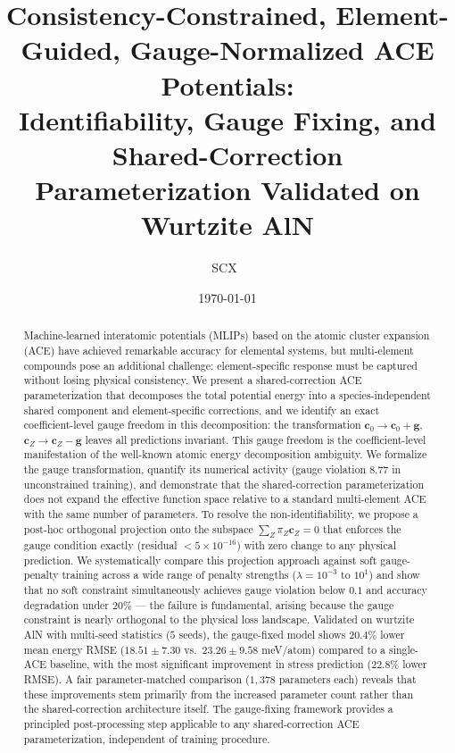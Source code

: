 \documentclass[twoside,prb,aps,floatfix,superscriptaddress,longbibliography]{revtex4-2}
\begin{document}
\title{Consistency-Constrained, Element-Guided, Gauge-Normalized ACE Potentials: \\
Identifiability, Gauge Fixing, and Shared-Correction \\
Parameterization Validated on Wurtzite AlN}

\author{SCX\ }

\date{\today}

\begin{abstract}
Machine-learned interatomic potentials (MLIPs) based on the atomic cluster expansion (ACE) have achieved remarkable accuracy for elemental systems, but multi-element compounds pose an additional challenge: element-specific response must be captured without losing physical consistency. We present a shared-correction ACE parameterization that decomposes the total potential energy into a species-independent shared component and element-specific corrections, and we identify an exact coefficient-level gauge freedom in this decomposition: the transformation $\mathbf{c}_0 \to \mathbf{c}_0 + \mathbf{g}$, $\mathbf{c}_Z \to \mathbf{c}_Z - \mathbf{g}$ leaves all predictions invariant. This gauge freedom is the coefficient-level manifestation of the well-known atomic energy decomposition ambiguity. We formalize the gauge transformation, quantify its numerical activity (gauge violation $8.77$ in unconstrained training), and demonstrate that the shared-correction parameterization does not expand the effective function space relative to a standard multi-element ACE with the same number of parameters. To resolve the non-identifiability, we propose a post-hoc orthogonal projection onto the subspace $\sum_Z \pi_Z \mathbf{c}_Z = 0$ that enforces the gauge condition exactly (residual $< 5\times10^{-16}$) with zero change to any physical prediction. We systematically compare this projection approach against soft gauge-penalty training across a wide range of penalty strengths ($\lambda = 10^{-3}$ to $10^1$) and show that no soft constraint simultaneously achieves gauge violation below $0.1$ and accuracy degradation under $20\%$ --- the failure is fundamental, arising because the gauge constraint is nearly orthogonal to the physical loss landscape. Validated on wurtzite AlN with multi-seed statistics ($5$ seeds), the gauge-fixed model shows $20.4\%$ lower mean energy RMSE ($18.51 \pm 7.30$ vs.\ $23.26 \pm 9.58$ meV/atom) compared to a single-ACE baseline, with the most significant improvement in stress prediction ($22.8\%$ lower RMSE). A fair parameter-matched comparison ($1{,}378$ parameters each) reveals that these improvements stem primarily from the increased parameter count rather than the shared-correction architecture itself. The gauge-fixing framework provides a principled post-processing step applicable to any shared-correction ACE parameterization, independent of training procedure.
\end{abstract}
\end{document}
